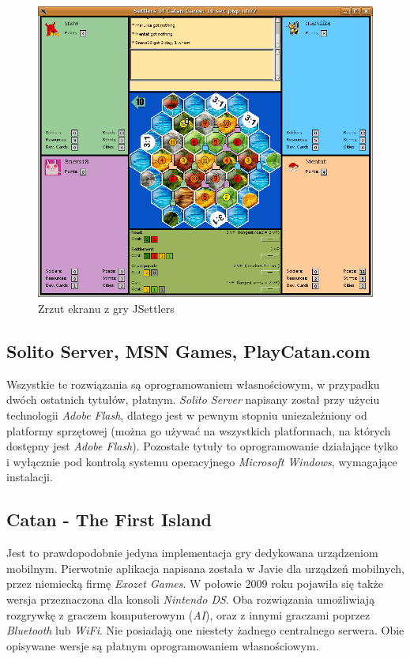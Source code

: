 \documentclass[a4paper,12pt]{article}
\begin{document}
\begin{figure}[ht]
  \begin{center}
    \includegraphics[width=\linewidth]{jsettlers.png}
  \end{center}
  \caption{Zrzut ekranu z gry JSettlers}
  \label{jsettlers}
\end{figure}

\subsection{Solito Server, MSN Games, PlayCatan.com}
Wszystkie te rozwiązania są oprogramowaniem własnościowym, w przypadku
dwóch ostatnich tytułów, płatnym. \emph{Solito Server} napisany został
przy użyciu technologii \emph{Adobe Flash}, dlatego jest w pewnym
stopniu uniezależniony od platformy sprzętowej (można go używać na
wszystkich platformach, na których dostępny jest \emph{Adobe
  Flash}). Pozostałe tytuły to oprogramowanie działające tylko i
wyłącznie pod kontrolą systemu operacyjnego \emph{Microsoft Windows},
wymagające instalacji.

\subsection{Catan - The First Island}
Jest to prawdopodobnie jedyna implementacja gry dedykowana urządzeniom
mobilnym. Pierwotnie aplikacja napisana została w Javie dla urządzeń
mobilnych, przez niemiecką firmę \emph{Exozet Games}. W połowie 2009
roku pojawiła się także wersja przeznaczona dla konsoli \emph{Nintendo
  DS}. Oba rozwiązania umożliwiają rozgrywkę z graczem komputerowym
(\emph{AI}), oraz z innymi graczami poprzez \emph{Bluetooth} lub
\emph{WiFi}. Nie posiadają one niestety żadnego centralnego
serwera. Obie opisywane wersje są płatnym oprogramowaniem
własnościowym.
\end{document}

